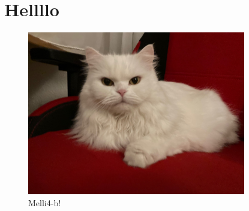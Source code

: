 \documentclass[12pt,ngerman,parskip=full]{scrreprt}
\begin{document}
\blindtext[2]

\section{Hellllo}

\begin{figure}[b!]\centering
\includegraphics[width=0.85\textwidth]{Images/Katze}
\caption{Melli4-b!}
\end{figure}

\blindtext[3]

\blindtext[2]
\end{document}
